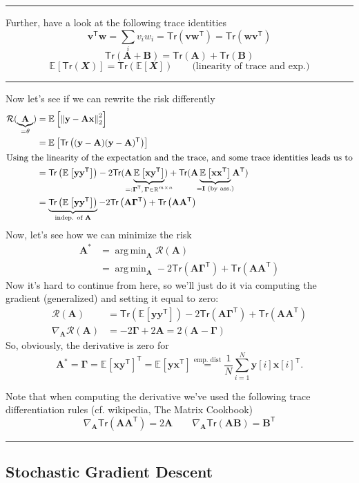 \documentclass[a2paper,8pt]{extarticle}
\newcommand{\R}{\mathbb{R}}
\newcommand{\cR}{\mathcal{R}}
\newcommand{\norm}[1]{\left\lVert #1 \right\rVert}
\newcommand{\Tr}[1]{\mathsf{Tr}\left( #1 \right)}
\newcommand{\sTr}[1]{\mathsf{Tr}( #1 )}
\newcommand{\Exp}[2][]{{\mathbb{E}_{#1}}\left[ #2
\right]}
\newcommand{\rvX}{\mathbfit{X}}
\newcommand*{\T}{\mathsf{T}}
\DeclareMathOperator*{\argmin}{arg\,min}
\newcommand{\mat}[1]{\mathbf{#1}}
\renewcommand{\vec}[1]{\mathbf{#1}}
\newcommand{\vv}{\vec{v}}
\newcommand{\vw}{\vec{w}}
\newcommand{\vx}{\vec{x}}
\newcommand{\vy}{\vec{y}}
\newcommand{\MA}{\mat{A}}
\newcommand{\MB}{\mat{B}}
\newcommand{\MI}{\mat{I}}
\newcommand{\MGamma}{\mat{\Gamma}}
\newcommand{\sep}{\vspace{0pt}\noindent\hrule\vspace{0pt}}
\newcommand{\ssep}{\hdashrule[1.1ex]{\linewidth}{0.1pt}{0.3mm}\vspace{-6pt}}
\newcommand{\sep}{\vspace{5pt}\noindent\hrule\vspace{5pt}}
\newcommand{\ssep}{\hdashrule[1.1ex]{\linewidth}{0.1pt}{0.3mm}\vspace{-3pt}}
\begin{document}
\begin{landscape}
\begin{multicols*}{7}
\sep

Further, have a look at the following trace identities
\[
\vv^\T\vw=
\sum_{i}v_iw_i
=
\Tr{\vv\vw^\T}
=
\Tr{\vw\vv^\T}
\]
\[
\Tr{\MA+\MB}=\Tr{\MA} + \Tr{\MB}
\]
\[
\Exp{\Tr{\rvX}}=\Tr{\Exp{\rvX}} \qquad\text{(linearity of trace and exp.)}
\]

\sep

Now let's see if we can rewrite the risk differently
\begin{gather*}
\begin{align*}
\cR(\underbrace{\MA}_{=\theta})
&=
\Exp{\norm{\vy-\MA\vx}_2^2}
\\
&=
\Exp{\Tr{(\vy-\MA)(\vy-\MA)^\T}}
\\
\shortintertext{Using the linearity of the expectation and the trace, and some
trace identities leads us to}
&=
\Tr{\Exp{\vy\vy^\T}}
-2\sTr{\MA\underbrace{\Exp{\vx\vy^\T}}_{\mathclap{=:\MGamma^\T,\,\MGamma\in\R^{m\times
n}}}} +\sTr{\MA\underbrace{\Exp{\vx\vx^\T}}_{\mathclap{=\MI\text{ (by
ass.)}}}\MA^\T}
\\
&=
\underbrace{\Tr{\Exp{\vy\vy^\T}}}_{\mathclap{\text{indep. of }\MA}}
-2\Tr{\MA\MGamma^\T}
+\Tr{\MA\MA^\T}
\end{align*}
\end{gather*}
Now, let's see how we can minimize the risk
\begin{align*}
\MA^*
&=
\argmin_{\MA}
\cR(\MA)
\\
&=
\argmin_{\MA}
-2\Tr{\MA\MGamma^\T}
+\Tr{\MA\MA^\T}
\end{align*}
Now it's hard to continue from here, so we'll just do it via computing the
gradient (generalized) and setting it equal to zero:
\begin{align*}
\cR(\MA)
&=
\Tr{\Exp{\vy\vy^\T}}
-2\Tr{\MA\MGamma^\T}
+\Tr{\MA\MA^\T}
\\
\nabla_{\MA}\cR(\MA)
&=
-2\MGamma + 2\MA
=2(\MA-\MGamma)
\end{align*}
So, obviously, the derivative is zero for 
\[
\MA^*=\MGamma
=\Exp{\vx\vy^\T}^\T
=\Exp{\vy\vx^\T}
\stackrel{\text{emp. dist}}{=}
\frac{1}{N}\sum_{i=1}^N\vy[i]\vx[i]^\T.
\]

\ssep

Note that when computing the derivative we've used the following trace
differentiation rules (cf. wikipedia, The Matrix Cookbook)
\[
\nabla_{\MA}\Tr{\MA\MA^\T}=2\MA
\qquad
\nabla_{\MA}\Tr{\MA\MB}=\MB^\T
\]

\sep


\subsection{Stochastic Gradient Descent}


\end{multicols*}
\end{landscape}
\end{document}
